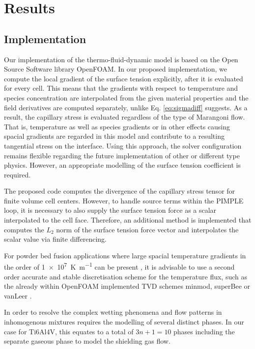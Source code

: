 \documentclass[conference,final]{IEEEtran}
\begin{document}
\section{Results}

\subsection{Implementation}

Our implementation of the thermo-fluid-dynamic model is based on the Open Source Software library OpenFOAM.
In our proposed implementation, we compute the local gradient of the surface tension explicitly, after it is evaluated for every cell. This means that the gradients with respect to temperature and species concentration are interpolated from the given material properties and the field derivatives are computed separately, unlike Eq. \ref{eq:sigmadiff} suggests.
As a result, the capillary stress is evaluated regardless of the type of Marangoni flow. That is, temperature as well as species gradients or in other effects causing spacial gradients are regarded in this model and contribute to a resulting tangential stress on the interface. Using this approach, the solver configuration remains flexible regarding the future implementation of other or different type physics. However, an appropriate modelling of the surface tension coefficient is required.

The proposed code computes the divergence of the capillary stress tensor for finite volume cell centers. However, to handle source terms within the PIMPLE loop, it is necessary to also supply the surface tension force as a scalar interpolated to the cell face. Therefore, an additional method is implemented that computes the $L_2$ norm of the surface tension force vector and interpolates the scalar value via finite differencing.

For powder bed fusion applications where large spacial temperature gradients in the order of \SI[per-mode=fraction]{1e7}{\kelvin \per \metre} can be present \cite{hooperMeltPoolTemperature2018}, it is advisable to use a second order accurate and stable discretisation scheme for the temperature flux, such as the already within OpenFOAM implemented TVD schemes minmod, superBee or vanLeer \cite{roeCharacteristicBasedSchemesEuler1986,vanleerUltimateConservativeDifference1974}.

In order to resolve the complex wetting phenomena and flow patterns in inhomogenous mixtures requires the modelling of several distinct phases. In our case for Ti6Al4V, this equates to a total of $3n +1 =10$ phases including the separate gaseous phase to model the shielding gas flow.
\end{document}
